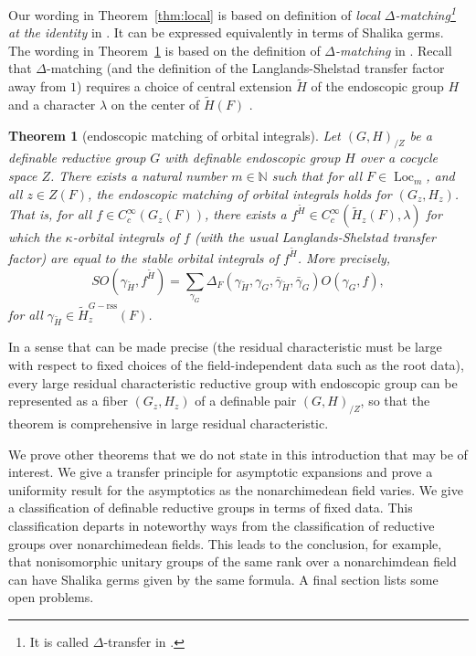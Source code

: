\documentclass[12pt]{amsart}
\newcommand{\op}[1]{\operatorname{#1}}
\newcommand{\ring}[1]{{\mathbb #1}}
\newcommand{\reg}{\mathrm{rss}}
\theoremstyle{plain}
\newtheorem{theorem}[thm]{Theorem}
\theoremstyle{definition}
\begin{document}
Our wording in Theorem~\ref{thm:local} is based on definition of {\it
  local $\Delta$-matching\footnote{It is called $\Delta$-transfer in
    \cite{LSd}.} at the identity} in \cite{LSd}.  It can be
expressed equivalently in terms of Shalika germs.  The wording in
Theorem~\ref{thm:xfer} is based on the definition of {\it
  $\Delta$-matching} in \cite{LSd}.  Recall that $\Delta$-matching
(and the definition of the Langlands-Shelstad transfer factor away
from $1$) requires a choice of central extension $\tilde H$ of the
endoscopic group $H$ and a character $\lambda$ on the center of
$\tilde H(F)$ \cite[Sec.4.4]{LSxf}.

\begin{theorem}[endoscopic matching of orbital integrals]\label{thm:xfer}
  Let $(G,H)_{/Z}$ be a definable reductive group $G$ with definable
  endoscopic group $H$ over a cocycle space $Z$.  There exists a
  natural number $m\in \ring{N}$ such that for all $F\in
  \op{Loc}_{m}$, and all $z\in Z(F)$, the endoscopic matching of
  orbital integrals holds for $(G_z,H_z)$.  That is, for all $f\in
  C_c^\infty(G_z(F))$, there exists a $f^{\tilde H}\in
  C_c^\infty(\tilde H_z(F),\lambda)$ for which the $\kappa$-orbital
  integrals of $f$ (with the usual Langlands-Shelstad transfer factor)
  are equal to the stable orbital integrals of $f^{\tilde H}$. More
  precisely,
\[
SO(\gamma_{\tilde H},f^{\tilde H}) = \sum_{\gamma_G}
\Delta_F(\gamma_{\tilde H},\gamma_G,\bar
\gamma_{\tilde H},\bar \gamma_G) O(\gamma_G,f),
\]
for all $\gamma_{\tilde H}\in {\tilde H}^{G-\reg}_z(F)$.
\end{theorem}

In a sense that can be made precise (the residual characteristic must
be large with respect to fixed choices of the field-independent data
such as the root data), every large residual characteristic reductive
group with endoscopic group can be represented as a fiber $(G_z,H_z)$
of a definable pair $(G,H)_{/Z}$, so that the theorem is comprehensive in
large residual characteristic.

We prove other theorems that we do not state in this introduction that
may be of interest.  We give a transfer principle for asymptotic
expansions and prove a uniformity result for the asymptotics as the
nonarchimedean field varies.  We give a classification of definable
reductive groups in terms of fixed data.  This classification departs in
noteworthy ways from the classification of reductive groups
over nonarchimedean fields.  This leads to the conclusion, for
example, that nonisomorphic unitary groups of the same rank over a
nonarchimdean field can have Shalika germs given by the same formula.
A final section lists some open problems.
\end{document}

